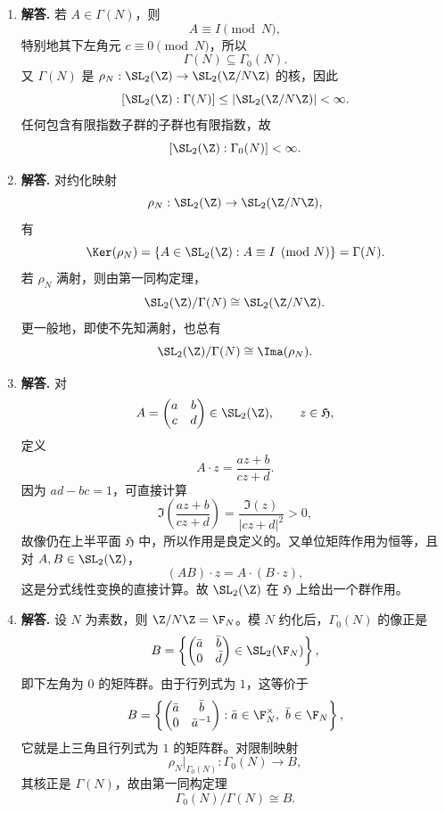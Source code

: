 \begin{enumerate}[label=\textbf{\arabic*.}, leftmargin=*, itemsep=1em]
\item \textbf{解答.} 若 $A\in \Gamma(N)$，则
\[
A\equiv I\pmod N,
\]
特别地其下左角元 $c\equiv0\pmod N$，所以
\[
\Gamma(N)\subseteq \Gamma_0(N).
\]
又 $\Gamma(N)$ 是 $\rho_N:\SL_2(\Z)\to \SL_2(\Z/N\Z)$ 的核，因此
\[
[\SL_2(\Z):\Gamma(N)]\le |\SL_2(\Z/N\Z)|<\infty.
\]
任何包含有限指数子群的子群也有限指数，故
\[
[\SL_2(\Z):\Gamma_0(N)]<\infty.
\]

\item \textbf{解答.} 对约化映射
\[
\rho_N:\SL_2(\Z)\to \SL_2(\Z/N\Z),
\]
有
\[
\Ker(\rho_N)=\left\{A\in \SL_2(\Z):A\equiv I\pmod N\right\}=\Gamma(N).
\]
若 $\rho_N$ 满射，则由第一同构定理，
\[
\SL_2(\Z)/\Gamma(N)\cong \SL_2(\Z/N\Z).
\]
更一般地，即使不先知满射，也总有
\[
\SL_2(\Z)/\Gamma(N)\cong \Ima(\rho_N).
\]

\item \textbf{解答.} 对
\[
A=\begin{pmatrix}a&b\\ c&d\end{pmatrix}\in \SL_2(\Z),\qquad z\in \mathfrak H,
\]
定义
\[
A\cdot z=\frac{az+b}{cz+d}.
\]
因为 $ad-bc=1$，可直接计算
\[
\Im\!\left(\frac{az+b}{cz+d}\right)=\frac{\Im(z)}{|cz+d|^2}>0,
\]
故像仍在上半平面 $\mathfrak H$ 中，所以作用是良定义的。又单位矩阵作用为恒等，且对 $A,B\in \SL_2(\Z)$，
\[
(A B)\cdot z=A\cdot(B\cdot z),
\]
这是分式线性变换的直接计算。故 $\SL_2(\Z)$ 在 $\mathfrak H$ 上给出一个群作用。

\item \textbf{解答.} 设 $N$ 为素数，则 $\Z/N\Z=\F_N$。模 $N$ 约化后，$\Gamma_0(N)$ 的像正是
\[
B=\left\{
\begin{pmatrix}\bar a&\bar b\\ 0&\bar d\end{pmatrix}\in \SL_2(\F_N)
\right\},
\]
即下左角为 $0$ 的矩阵群。由于行列式为 $1$，这等价于
\[
B=\left\{
\begin{pmatrix}\bar a&\bar b\\ 0&\bar a^{-1}\end{pmatrix}:\bar a\in \F_N^\times,\ \bar b\in \F_N
\right\},
\]
它就是上三角且行列式为 $1$ 的矩阵群。对限制映射
\[
\rho_N|_{\Gamma_0(N)}:\Gamma_0(N)\to B,
\]
其核正是 $\Gamma(N)$，故由第一同构定理
\[
\Gamma_0(N)/\Gamma(N)\cong B.
\]


\end{enumerate}
